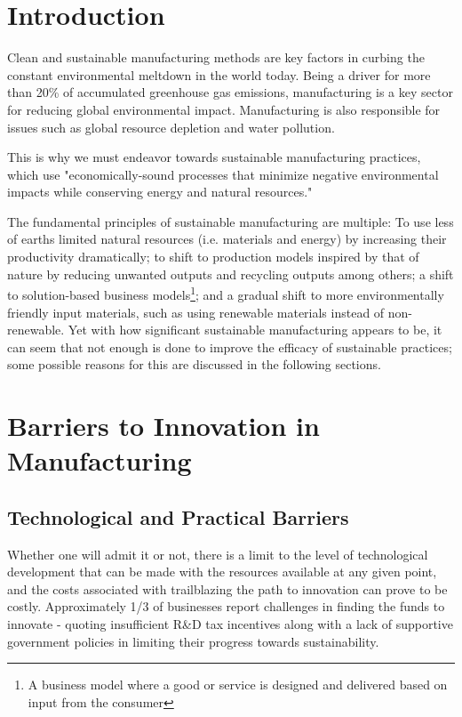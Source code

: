 \documentclass[11pt,a4paper]{article}
\begin{document}
 



\section{Introduction}

Clean and sustainable manufacturing methods are key factors in curbing the constant environmental meltdown in the world today. Being a driver for more than 20\% of accumulated greenhouse gas emissions\cite{kazakova2022sustainable}, manufacturing is a key sector for reducing global environmental impact. Manufacturing is also responsible for issues such as global resource depletion and water pollution.

This is why we must endeavor towards sustainable manufacturing practices, which use "economically-sound processes that minimize negative environmental impacts while conserving energy and natural resources\cite{usepa2024sustainable}."

The fundamental principles of sustainable manufacturing are multiple: To use less of earths limited natural resources (i.e. materials and energy) by increasing their productivity dramatically; to shift to production models inspired by that of nature by reducing unwanted outputs and recycling outputs among others; a shift to solution-based business models\footnote{A business model where a good or service is designed and delivered based on input from the consumer}; and a gradual shift to more environmentally friendly input materials, such as using renewable materials instead of non-renewable\cite{despeisse2012emergence}. Yet with how significant sustainable manufacturing appears to be, it can seem that not enough is done to improve the efficacy of sustainable practices; some possible reasons for this are discussed in the following sections.



\section{Barriers to Innovation in Manufacturing}


\subsection*{Technological and Practical Barriers}

Whether one will admit it or not, there is a limit to the level of technological development that can be made with the resources available at any given point, and the costs associated with trailblazing the path to innovation can prove to be costly. Approximately 1/3 of businesses report challenges in finding the funds to innovate - quoting insufficient R\&D tax incentives along with a lack of supportive government policies in limiting their progress towards sustainability\cite{ayming2024barometer}.
\end{document}
